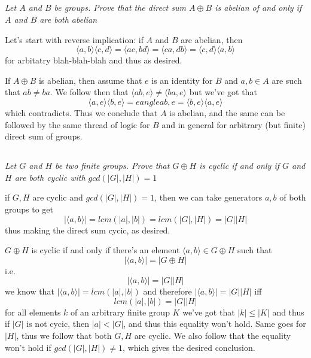 \documentclass[11pt,oneside,titlepage]{book}
\newcommand{\eangle}[1]{\langle #1 \rangle}
\begin{document}
\subsection{}

\textit{Let $A$ and $B$ be groups. Prove that the direct sum $A \oplus B$ is abelian of and
  only if $A$ and $B$ are both abelian}

Let's start with reverse implication: if $A$ and $B$ are abelian, then
$$\eangle{a, b} \eangle{c, d} = \eangle{ac, bd} = \eangle{ca, db} = \eangle{c, d} \eangle{a, b}$$
for arbitatry blah-blah-blah and thus as desired.

If $A \oplus B$ is abelian, then assume that $e$ is an identity for $B$ and $a, b \in A$ are
such that $ab \neq ba$. We follow then that $\eangle{ab, e} \neq \eangle{ba, e}$ but we've got that
$$\eangle{a, e} \eangle{b, e} = eangle{ab, e} = \eangle{b, e} \eangle{a, e}$$
which contradicts. Thus we conclude that $A$ is abelian, and the same can be followed by the
same thread of logic for $B$ and in general for arbitrary (but finite) direct sum of groups.

\subsection{}

\textit{Let $G$ and $H$ be two finite groups. Prove that $G \oplus H$ is cyclic if and only
  if $G$ and $H$ are both cyclic with $gcd(|G|, |H|) = 1$ }

if $G, H$ are cyclic and $gcd(|G|, |H|) = 1$, then we can take generators $a, b$ of both groups
to get
$$|\eangle{a, b}| = lcm(|a|, |b|) = lcm(|G|, |H|) = |G||H|$$
thus making the direct sum cycic, as desired.

$G \oplus H$ is cyclic if and only if there's an element $\eangle{a, b} \in G \oplus H$ such that
$$|\eangle{a, b}| = |G \oplus H|$$
i.e.
$$|\eangle{a, b}| = |G| |H|$$
we know that $|\eangle{a, b}| = lcm(|a|, |b|)$ and therefore $|\eangle{a, b}| = |G| |H|$ iff
$$lcm(|a|, |b|) = |G||H|$$
for all elements $k$ of an arbitrary finite group $K$ we've got that $|k| \leq |K|$ and thus 
if $|G|$ is not cycic, then $|a| < |G|$, and thus this equality won't hold. Same goes for $|H|$,
thus we follow that both $G, H$ are cyclic. We also follow that the equality won't hold if
$gcd(|G|, |H|) \neq 1$, which gives the desired conclusion.

\subsection{}
\end{document}
